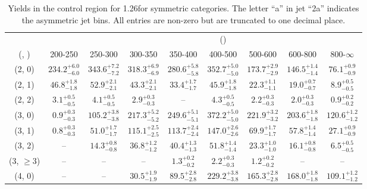 \begin{table}[h!]
\tiny
\centering
\caption{Yields in the \mj control region for 1.26\ifb for symmetric categories. The letter ``a'' in jet \eg ``2a''  indicates the asymmetric jet bins. All entries are non-zero but are truncated to one decimal place.\label{tab:yieldssep_ewk_mu_sym}}
\begin{tabular}
{ccccccccc}
	\hline\hline
&	& \multicolumn{8}{c}{\scalht (\gev)} \\ 
	 (\njet,  \nb) & 200-250 & 250-300 & 300-350 & 350-400 & 400-500 & 500-600 & 600-800 & 800-$\infty$ \\ [0.8ex] 
\hline
	(2, 0) & $234.2^{+ 6.0 }_{- 6.0 }$ & $343.6^{+ 7.2 }_{- 7.2 }$ & $318.3^{+ 6.9 }_{- 6.9 }$ & $280.6^{+ 5.8 }_{- 5.8 }$ & $352.7^{+ 5.0 }_{- 5.0 }$ & $173.7^{+ 2.9 }_{- 2.9 }$ & $146.5^{+ 1.4 }_{- 1.4 }$ & $76.1^{+ 0.9 }_{- 0.9 }$ \\[0.5ex] 
	(2, 1) & $46.8^{+ 1.8 }_{- 1.8 }$ & $52.9^{+ 2.1 }_{- 2.1 }$ & $43.3^{+ 2.1 }_{- 2.1 }$ & $33.4^{+ 1.7 }_{- 1.7 }$ & $45.9^{+ 1.8 }_{- 1.8 }$ & $22.3^{+ 1.1 }_{- 1.1 }$ & $19.0^{+ 0.7 }_{- 0.7 }$ & $8.9^{+ 0.5 }_{- 0.5 }$ \\[0.5ex] 
	(2, 2) & $3.1^{+ 0.5 }_{- 0.5 }$ & $4.1^{+ 0.5 }_{- 0.5 }$ & $2.9^{+ 0.3 }_{- 0.3 }$ & -- & $4.3^{+ 0.5 }_{- 0.5 }$ & $2.2^{+ 0.3 }_{- 0.3 }$ & $2.0^{+ 0.3 }_{- 0.3 }$ & $0.9^{+ 0.2 }_{- 0.2 }$ \\[0.5ex] 
	(3, 0) & $0.9^{+ 0.3 }_{- 0.3 }$ & $105.2^{+ 3.8 }_{- 3.8 }$ & $217.3^{+ 5.2 }_{- 5.2 }$ & $249.6^{+ 5.1 }_{- 5.1 }$ & $372.2^{+ 5.0 }_{- 5.0 }$ & $221.9^{+ 3.2 }_{- 3.2 }$ & $203.6^{+ 1.8 }_{- 1.8 }$ & $120.6^{+ 1.2 }_{- 1.2 }$ \\[0.5ex] 
	(3, 1) & $0.8^{+ 0.3 }_{- 0.3 }$ & $51.0^{+ 1.7 }_{- 1.7 }$ & $115.1^{+ 2.5 }_{- 2.5 }$ & $113.7^{+ 2.4 }_{- 2.4 }$ & $147.0^{+ 2.6 }_{- 2.6 }$ & $69.9^{+ 1.7 }_{- 1.7 }$ & $57.8^{+ 1.4 }_{- 1.4 }$ & $27.1^{+ 0.9 }_{- 0.9 }$ \\[0.5ex] 
	(3, 2) & -- & $14.3^{+ 0.8 }_{- 0.8 }$ & $36.8^{+ 1.2 }_{- 1.2 }$ & $40.4^{+ 1.3 }_{- 1.3 }$ & $51.8^{+ 1.4 }_{- 1.4 }$ & $23.3^{+ 1.0 }_{- 1.0 }$ & $16.1^{+ 0.8 }_{- 0.8 }$ & $6.5^{+ 0.5 }_{- 0.5 }$ \\[0.5ex] 
	(3, $\ge3$) & -- & -- & -- & $1.3^{+ 0.2 }_{- 0.2 }$ & $2.2^{+ 0.3 }_{- 0.3 }$ & $1.2^{+ 0.2 }_{- 0.2 }$ & -- & -- \\[0.5ex] 
	(4, 0) & -- & -- & $30.5^{+ 1.9 }_{- 1.9 }$ & $89.5^{+ 2.8 }_{- 2.8 }$ & $229.2^{+ 3.8 }_{- 3.8 }$ & $165.3^{+ 2.8 }_{- 2.8 }$ & $168.0^{+ 1.8 }_{- 1.8 }$ & $109.1^{+ 1.2 }_{- 1.2 }$ \\[0.5ex] 

\end{tabular}
\end{table}
